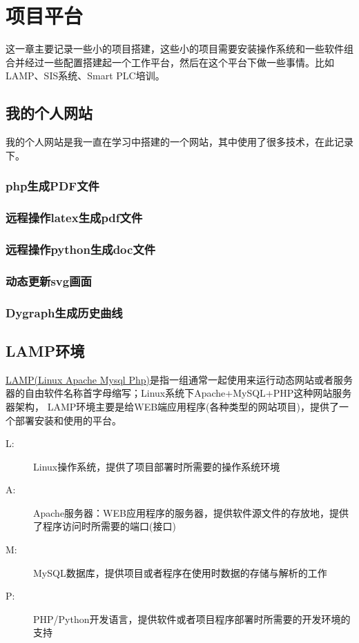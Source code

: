 \chapter{项目平台}
这一章主要记录一些小的项目搭建，这些小的项目需要安装操作系统和一些软件组合并经过一些配置搭建起一个工作平台，然后在这个平台下做一些事情。比如LAMP、SIS系统、Smart PLC培训。
\section{我的个人网站}
我的个人网站是我一直在学习中搭建的一个网站，其中使用了很多技术，在此记录下。
\subsection{php生成PDF文件}
\subsection{远程操作latex生成pdf文件}
\subsection{远程操作python生成doc文件}
\subsection{动态更新svg画面}
\subsection{Dygraph生成历史曲线}
\section{LAMP环境}
\href{https://blog.csdn.net/sj349781478/article/details/84224440?ops_request_misc=%257B%2522request%255Fid%2522%253A%252249718a9a6d88ebb92a001e305b31fd12%2522%252C%2522scm%2522%253A%252220140713.130102334..%2522%257D&request_id=49718a9a6d88ebb92a001e305b31fd12&biz_id=0&utm_medium=distribute.pc_search_result.none-task-blog-2~all~top_positive~default-1-84224440-null-null.142^v101^pc_search_result_base7&utm_term=lamp%E6%9E%B6%E6%9E%84&spm=1018.2226.3001.4187}{LAMP(Linux Apache Mysql Php)}是指一组通常一起使用来运行动态网站或者服务器的自由软件名称首字母缩写；Linux系统下Apache+MySQL+PHP这种网站服务器架构， LAMP环境主要是给WEB端应用程序(各种类型的网站项目)，提供了一个部署安装和使用的平台。
\begin{description}
	\item[L:]Linux操作系统，提供了项目部署时所需要的操作系统环境
	\item[A:]Apache服务器：WEB应用程序的服务器，提供软件源文件的存放地，提供了程序访问时所需要的端口(接口)
	\item[M:]MySQL数据库，提供项目或者程序在使用时数据的存储与解析的工作
	\item[P:]PHP/Python开发语言，提供软件或者项目程序部署时所需要的开发环境的支持
\end{description}

